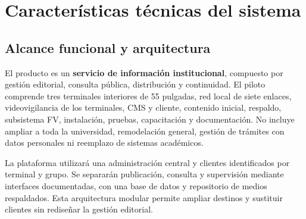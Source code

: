 \clearpage
\section{Características técnicas del sistema}
\subsection{Alcance funcional y arquitectura}
El producto es un \textbf{servicio de información institucional}, compuesto por gestión editorial, consulta pública, distribución y continuidad. El piloto comprende tres terminales interiores de 55 pulgadas, red local de siete enlaces, videovigilancia de los terminales, CMS y cliente, contenido inicial, respaldo, subsistema FV, instalación, pruebas, capacitación y documentación. No incluye ampliar a toda la universidad, remodelación general, gestión de trámites con datos personales ni reemplazo de sistemas académicos.

La plataforma utilizará una administración central y clientes identificados por terminal y grupo. Se separarán publicación, consulta y supervisión mediante interfaces documentadas, con una base de datos y repositorio de medios respaldados. Esta arquitectura modular permite ampliar destinos y sustituir clientes sin rediseñar la gestión editorial.

\begin{center}
\label{fig:arquitectura}
\end{center}

